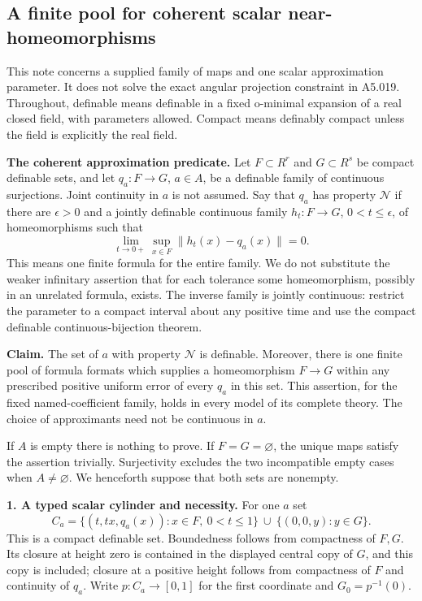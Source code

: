 \subsection*{A finite pool for coherent scalar near-homeomorphisms}

This note concerns a supplied family of maps and one scalar approximation
parameter. It does not solve the exact angular projection constraint in
A5.019. Throughout, definable means definable in a fixed o-minimal expansion
of a real closed field, with parameters allowed. Compact means definably
compact unless the field is explicitly the real field.

\textbf{The coherent approximation predicate.}
Let $F\subset R^r$ and $G\subset R^s$ be compact definable sets, and let
$q_a:F\to G$, $a\in A$, be a definable family of continuous surjections.
Joint continuity in $a$ is not assumed. Say that $q_a$ has property $\mathcal N$
if there are $\epsilon>0$ and a jointly definable continuous family
$h_t:F\to G$, $0<t\leq\epsilon$, of homeomorphisms such that
\[
 \lim_{t\to0+}\sup_{x\in F}\|h_t(x)-q_a(x)\|=0.                 \tag{NH.1}
\]
This means one finite formula for the entire family. We do not substitute
the weaker infinitary assertion that for each tolerance some homeomorphism,
possibly in an unrelated formula, exists. The inverse family is jointly
continuous: restrict the parameter to a compact interval about any positive
time and use the compact definable continuous-bijection theorem.

\textbf{Claim.}
The set of $a$ with property $\mathcal N$ is definable. Moreover, there is
one finite pool of formula formats which supplies a homeomorphism
$F\to G$ within any prescribed positive uniform error of every $q_a$ in
this set. This assertion, for the fixed named-coefficient family, holds in
every model of its complete theory. The choice of approximants need not be
continuous in $a$.

If $A$ is empty there is nothing to prove. If $F=G=\varnothing$, the unique
maps satisfy the assertion trivially. Surjectivity excludes the two
incompatible empty cases when $A\ne\varnothing$. We henceforth suppose
that both sets are nonempty.

\textbf{1. A typed scalar cylinder and necessity.}
For one $a$ set
\[
 C_a=\{(t,tx,q_a(x)):x\in F,\ 0<t\leq1\}
       \ \cup\ \{(0,0,y):y\in G\}.                              \tag{NH.2}
\]
This is a compact definable set. Boundedness follows from compactness of
$F,G$. Its closure at height zero is contained in the displayed central
copy of $G$, and this copy is included; closure at a positive height follows
from compactness of $F$ and continuity of $q_a$. Write $p:C_a\to[0,1]$
for the first coordinate and $G_0=p^{-1}(0)$.

